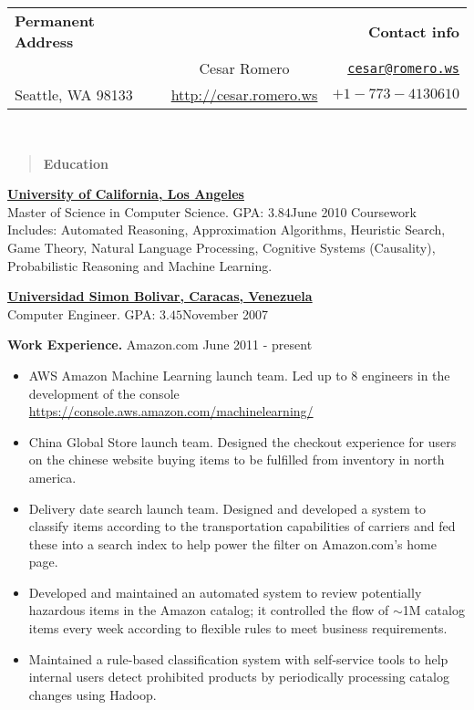 \documentclass[10pt]{article}
\newcommand{\vitem}{\vspace*{-.4pc}\item}
\begin{document}
\begin{tabular}{lcr}
  \textbf{Permanent Address}&&\textbf{Contact info}\\
  \href{}{}&\hspace*{2cm}\huge{Cesar Romero}\hspace*{2cm}&\href{mailto:cesar@romero.ws}{\texttt{cesar@romero.ws}}\\
Seattle, WA
98133&\href{http://cesar.romero.ws}{http://cesar.romero.ws}&$+1-773-4130610$\\
\end{tabular}\\
\underline{\makebox[\textwidth]{\hfill}}
\begin{quote}
  \centering{}
 \textbf{Education}
\end{quote}
\href{http://www.ucla.edu}{\textbf{University of California, Los Angeles}}\\
Master of Science in Computer Science. GPA: $3.84$\hfill June 2010
Coursework Includes: Automated Reasoning, Approximation Algorithms,
Heuristic Search, Game Theory, Natural Language Processing, Cognitive
Systems (Causality), Probabilistic Reasoning and Machine Learning.

\noindent\href{http://www.usb.ve}{\textbf{Universidad Simon Bolivar, Caracas, Venezuela}}\\
Computer Engineer. GPA: $3.45$\hfill November 2007

\centering{}\textbf{Work Experience.}
 Amazon.com \hfill June 2011 - present
\begin{itemize}
  \vitem AWS Amazon Machine Learning launch team. Led up to 8
  engineers in the development of the console
  \href{https://console.aws.amazon.com/machinelearning/}{https://console.aws.amazon.com/machinelearning/}
  \vitem China Global Store launch team. Designed the checkout
  experience for users on the chinese website buying items to be
  fulfilled from inventory in north america.
  \vitem Delivery date search launch team. Designed and developed a
  system to classify items according to the transportation
  capabilities of carriers and fed these into a search index to help
  power the filter on Amazon.com's home page.
  \vitem Developed and maintained an automated system to review
  potentially hazardous items in the Amazon catalog; it controlled the
  flow of $\sim$1M catalog items every week according to flexible rules to
  meet business requirements.
  \vitem Maintained a rule-based classification system with
  self-service tools to help internal users detect prohibited products
  by periodically processing catalog changes using Hadoop.
\end{itemize}
\end{document}
